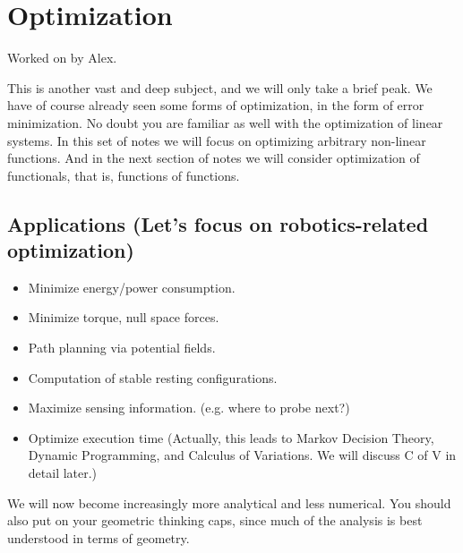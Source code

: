 \chapter{Optimization}

Worked on by Alex.

This is another vast and deep subject, and we will only take a brief peak.
We have of course already seen some forms of optimization, in the form of error minimization.
No doubt you are familiar as well with the optimization of linear systems.
In this set of notes we will focus on optimizing arbitrary non-linear functions.
And in the next section of notes we will consider optimization of functionals, that is, functions of functions.

\section{Applications (Let's focus on robotics-related optimization)}

\begin{itemize}
  \item Minimize energy/power consumption.
  \item Minimize torque, null space forces.
  \item Path planning via potential fields.
  \item Computation of stable resting configurations.
  \item Maximize sensing information. (e.g. where to probe next?)
  \item Optimize execution time (Actually, this leads to Markov Decision Theory, Dynamic Programming, and Calculus of Variations. We will discuss C of V in detail later.)
\end{itemize}

We will now become increasingly more analytical and less numerical.
You should also put on your geometric thinking caps, since much of the analysis is best understood in terms of geometry.

